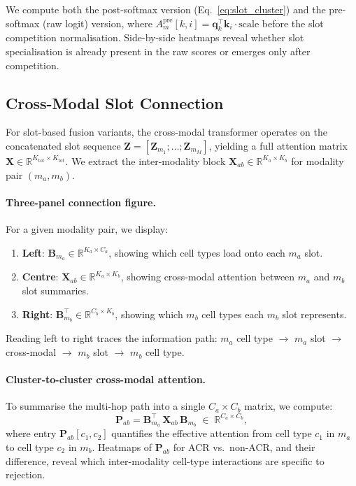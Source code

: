 \documentclass[11pt,a4paper]{article}
\begin{document}
We compute both the post-softmax version (Eq.~\eqref{eq:slot_cluster}) and the
pre-softmax (raw logit) version, where
$A^\text{pre}_m[k,i] = \mathbf{q}_k^\top \mathbf{k}_i \cdot \text{scale}$
before the slot competition normalisation.
Side-by-side heatmaps reveal whether slot specialisation is already present in
the raw scores or emerges only after competition.

\subsection{Cross-Modal Slot Connection}

For slot-based fusion variants, the cross-modal transformer operates on the
concatenated slot sequence
$\mathbf{Z} = [\mathbf{Z}_{m_1}; \ldots; \mathbf{Z}_{m_M}]$, yielding a full
attention matrix $\mathbf{X} \in \mathbb{R}^{K_\text{tot}\times K_\text{tot}}$.
We extract the inter-modality block
$\mathbf{X}_{ab} \in \mathbb{R}^{K_a\times K_b}$ for modality pair
$(m_a, m_b)$.

\paragraph{Three-panel connection figure.}
For a given modality pair, we display:
\begin{enumerate}
    \item \textbf{Left}: $\mathbf{B}_{m_a} \in \mathbb{R}^{K_a\times C_a}$,
          showing which cell types load onto each $m_a$ slot.
    \item \textbf{Centre}: $\mathbf{X}_{ab} \in \mathbb{R}^{K_a\times K_b}$,
          showing cross-modal attention between $m_a$ and $m_b$ slot
          summaries.
    \item \textbf{Right}: $\mathbf{B}_{m_b}^\top \in \mathbb{R}^{C_b\times K_b}$,
          showing which $m_b$ cell types each $m_b$ slot represents.
\end{enumerate}
Reading left to right traces the information path:
$m_a$ cell type $\to$ $m_a$ slot $\to$ cross-modal $\to$ $m_b$ slot $\to$
$m_b$ cell type.

\paragraph{Cluster-to-cluster cross-modal attention.}
To summarise the multi-hop path into a single $C_a\times C_b$ matrix, we
compute:
\begin{equation}
    \mathbf{P}_{ab}
    = \mathbf{B}_{m_a}^\top \,\mathbf{X}_{ab}\, \mathbf{B}_{m_b}
    \;\in\; \mathbb{R}^{C_a\times C_b},
    \label{eq:cluster_xmodal}
\end{equation}
where entry $\mathbf{P}_{ab}[c_1,c_2]$ quantifies the effective attention from
cell type $c_1$ in $m_a$ to cell type $c_2$ in $m_b$.
Heatmaps of $\mathbf{P}_{ab}$ for ACR vs.\ non-ACR, and their difference,
reveal which inter-modality cell-type interactions are specific to rejection.
\end{document}

